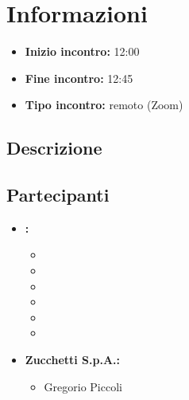 \section{Informazioni}
\begin{itemize}
	\item \textbf{Inizio incontro:} 12:00
	\item \textbf{Fine incontro:} 12:45
	\item \textbf{Tipo incontro:} remoto (Zoom)
\end{itemize}

\subsection{Descrizione}
\DocDescription

\subsection{Partecipanti}

\begin{itemize}
	\item \textbf{\GroupName:}
	\begin{itemize}
		\item \tommaso
		\item \marco
		\item \raul
		\item \sebastiano
		\item \martina
		\item \riccardo
	\end{itemize}

	\item \textbf{Zucchetti S.p.A.:}
	\begin{itemize}
		\item Gregorio Piccoli
	\end{itemize}
\end{itemize}

\clearpage
